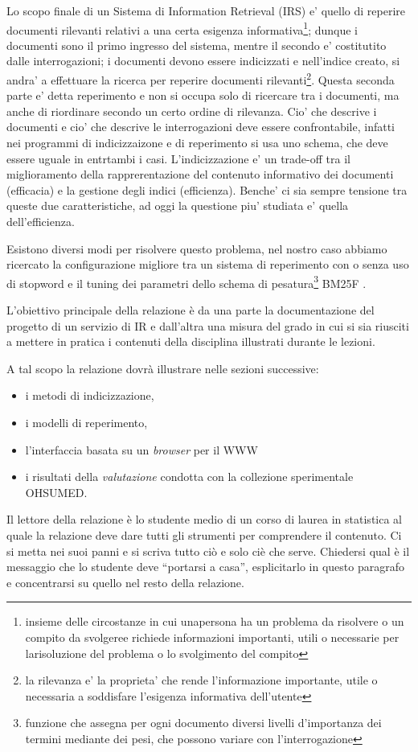 \documentclass[runningheads]{llncs}
\begin{document}
Lo scopo finale di un Sistema di Information Retrieval (IRS) e' quello di reperire documenti rilevanti relativi a una certa esigenza informativa\footnote{insieme delle circostanze in cui unapersona ha un problema da risolvere o un compito da svolgeree richiede informazioni importanti, utili o necessarie per larisoluzione del problema o lo svolgimento del compito}; dunque i documenti sono il primo ingresso del sistema, mentre il secondo e' costitutito dalle interrogazioni; i documenti devono essere indicizzati e nell'indice creato, si andra' a effettuare la ricerca per reperire documenti rilevanti\footnote{la rilevanza e' la proprieta' che rende l'informazione importante, utile o necessaria a soddisfare l'esigenza informativa dell'utente}. Questa seconda parte e' detta reperimento e non si occupa solo di ricercare tra i documenti, ma anche di riordinare secondo un certo ordine di rilevanza. Cio' che descrive i documenti e cio' che descrive le interrogazioni deve essere confrontabile, infatti nei programmi di indicizzaizone e di reperimento si usa uno schema, che deve essere uguale in entrtambi i casi.
L'indicizzazione e' un trade-off tra il  miglioramento della rapprerentazione del contenuto informativo dei documenti (efficacia) e la gestione degli indici (efficienza). Benche' ci sia sempre tensione tra queste due caratteristiche, ad oggi la questione piu' studiata e' quella dell'efficienza.

Esistono diversi modi per risolvere questo problema, nel nostro caso abbiamo ricercato la configurazione migliore tra un sistema di
reperimento con o senza uso di stopword e il tuning dei parametri dello schema di pesatura\footnote{funzione che assegna per ogni documento diversi livelli d’importanza dei termini mediante dei pesi, che possono variare con l’interrogazione} BM25F .




L'obiettivo principale della relazione \`e da una parte la
documentazione del progetto di un servizio di {IR} e dall'altra una
misura del grado in cui si sia riusciti a mettere in pratica i
contenuti della disciplina illustrati durante le lezioni.

A tal scopo la relazione dovr\`a illustrare nelle sezioni successive:
\begin{itemize}
\item i metodi di indicizzazione,
\item i modelli di reperimento,
\item l'interfaccia basata su un \textit{browser} per il {WWW}
\item i risultati della \emph{valutazione} condotta con la collezione
  sperimentale OHSUMED.
\end{itemize}
Il lettore della relazione \`e lo studente medio di un corso di laurea
in statistica al quale la relazione deve dare tutti gli strumenti per
comprendere il contenuto.  Ci si metta nei suoi panni e si scriva
tutto ci\`o e solo ci\`e che serve.  Chiedersi qual \`e il messaggio
che lo studente deve ``portarsi a casa'', esplicitarlo in questo
paragrafo e concentrarsi su quello nel resto della relazione.
\end{document}
